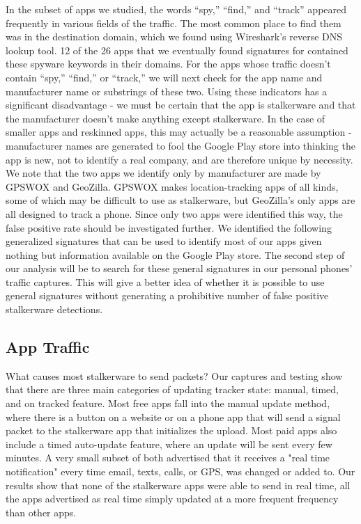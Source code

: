 \documentclass[acmtog]{acmart}
\begin{document}
In the subset of apps we studied, the words “spy,” “find,” and “track” appeared 
frequently in various fields of the traffic. The most common place to find them 
was in the destination domain, which we found using Wireshark’s reverse DNS 
lookup tool. 12 of the 26 apps that we eventually found signatures for 
contained these spyware keywords in their domains. 
For the apps whose traffic doesn’t contain “spy,” “find,” or “track,” we will 
next check for the app name and manufacturer name or substrings of these two. 
Using these indicators has a significant disadvantage - we must be certain that 
the app is stalkerware and that the manufacturer doesn’t make anything except 
stalkerware. In the case of smaller apps and reskinned apps, this may actually 
be a reasonable assumption - manufacturer names are generated to fool the 
Google Play store into thinking the app is new, not to identify a real company, 
and are therefore unique by necessity. We note that the two apps we identify 
only by manufacturer are made by GPSWOX and GeoZilla. GPSWOX makes 
location-tracking apps of all kinds, some of which may be difficult to use as 
stalkerware, but GeoZilla’s only apps are all designed to track a phone. Since 
only two apps were identified this way, the false positive rate should be 
investigated further.
We identified the following generalized signatures that can be used to identify 
most of our apps given nothing but information available on the Google Play 
store. The second step of our analysis will be to search for these general 
signatures in our personal phones’ traffic captures. This will give a better 
idea of whether it is possible to use general signatures without generating a 
prohibitive number of false positive stalkerware detections.


\subsection{App Traffic}

What causes most stalkerware to send packets? Our captures and testing show 
that there are three main categories of updating tracker state: manual, timed, 
and on tracked feature. Most free apps fall into the manual update method, 
where there is a button on a website or on a phone app that will send a signal 
packet to the stalkerware app that initializes the upload. Most paid apps also 
include a timed auto-update feature, where an update will be sent every few 
minutes. A very small subset of both advertised that it receives a "real time 
notification" every time email, texts, calls, or GPS, was changed or added to. 
Our results show that none of the stalkerware apps were able to send in real 
time, all the apps advertised as real time simply updated at a more frequent 
frequency than other apps.
\end{document}
